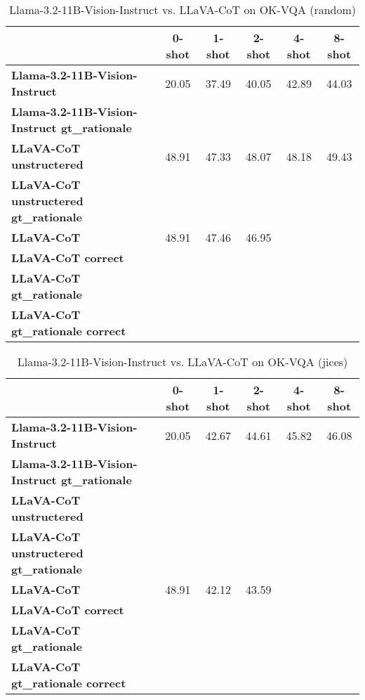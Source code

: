 \begin{table}
\caption{Llama-3.2-11B-Vision-Instruct vs. LLaVA-CoT on OK-VQA (random)}
\label{tab:Llama-3.2-11B-Vision-Instruct_OK-VQA_TRAIN_random}
\begin{tabular}{lccccc}
\toprule
 & 0-shot & 1-shot & 2-shot & 4-shot & 8-shot \\
\midrule
\textbf{Llama-3.2-11B-Vision-Instruct} & 20.05 & 37.49 & 40.05 & 42.89 & 44.03 \\
\textbf{Llama-3.2-11B-Vision-Instruct gt\_rationale} &  &  &  &  &  \\
\textbf{LLaVA-CoT unstructered} & 48.91 & 47.33 & 48.07 & 48.18 & 49.43 \\
\textbf{LLaVA-CoT unstructered gt\_rationale} &  &  &  &  &  \\
\textbf{LLaVA-CoT} & 48.91 & 47.46 & 46.95 &  &  \\
\textbf{LLaVA-CoT correct} &  &  &  &  &  \\
\textbf{LLaVA-CoT gt\_rationale} &  &  &  &  &  \\
\textbf{LLaVA-CoT gt\_rationale correct} &  &  &  &  &  \\
\bottomrule
\end{tabular}
\end{table}


\begin{table}
\caption{Llama-3.2-11B-Vision-Instruct vs. LLaVA-CoT on OK-VQA (jices)}
\label{tab:Llama-3.2-11B-Vision-Instruct_OK-VQA_TRAIN_jices}
\begin{tabular}{lccccc}
\toprule
 & 0-shot & 1-shot & 2-shot & 4-shot & 8-shot \\
\midrule
\textbf{Llama-3.2-11B-Vision-Instruct} & 20.05 & 42.67 & 44.61 & 45.82 & 46.08 \\
\textbf{Llama-3.2-11B-Vision-Instruct gt\_rationale} &  &  &  &  &  \\
\textbf{LLaVA-CoT unstructered} &  &  &  &  &  \\
\textbf{LLaVA-CoT unstructered gt\_rationale} &  &  &  &  &  \\
\textbf{LLaVA-CoT} & 48.91 & 42.12 & 43.59 &  &  \\
\textbf{LLaVA-CoT correct} &  &  &  &  &  \\
\textbf{LLaVA-CoT gt\_rationale} &  &  &  &  &  \\
\textbf{LLaVA-CoT gt\_rationale correct} &  &  &  &  &  \\
\bottomrule
\end{tabular}
\end{table}


